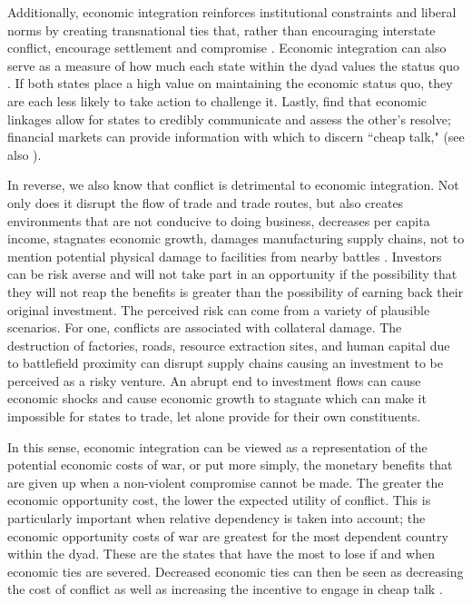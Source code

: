 \documentclass[12pt,letterpaper]{article}
\begin{document}
Additionally, economic integration reinforces institutional constraints and liberal norms by creating transnational ties that, rather than encouraging interstate conflict, encourage settlement and compromise \citep{Onealetal1996}. Economic integration can also serve as a measure of how much each state within the dyad values the status quo \citep{OnealRussett1997}. If both states place a high value on maintaining the economic status quo, they are each less likely to take action to challenge it. Lastly, \citet{GartzkeLiBohemer2001} find that economic linkages allow for states to credibly communicate and assess the other's resolve; financial markets can provide information with which to discern ``cheap talk," (see also \citet{GartzkeLi2003}).

In reverse, we also know that conflict is detrimental to economic integration. Not only does it disrupt the flow of trade and trade routes, but also creates environments that are not conducive to doing business, decreases per capita income, stagnates economic growth, damages manufacturing supply chains, not to mention potential physical damage to facilities from nearby battles \citep{Onealetal1996, DorussenWard2010}. Investors can be risk averse and will not take part in an opportunity if the possibility that they will not reap the benefits is greater than the possibility of earning back their original investment. The perceived risk can come from a variety of plausible scenarios. For one, conflicts are associated with collateral damage. The destruction of factories, roads, resource extraction sites, and human capital due to battlefield proximity can disrupt supply chains causing an investment to be perceived as a risky venture. An abrupt end to investment flows can cause economic shocks and cause economic growth to stagnate which can make it impossible for states to trade, let alone provide for their own constituents. 

In this sense, economic integration can be viewed as a representation of the potential economic costs of war, or put more simply, the monetary benefits that are given up when a non-violent compromise cannot be made. The greater the economic opportunity cost, the lower the expected utility of conflict. This is particularly important when relative dependency is taken into account; the economic opportunity costs of war are greatest for the most dependent country within the dyad. These are the states that have the most to lose if and when economic ties are severed. Decreased economic ties can then be seen as decreasing the cost of conflict as well as increasing the incentive to engage in cheap talk \citep{Bussmann2010, GartzkeLiBohemer2001, GartzkeLi2003, Fearon1995}.
\end{document}
